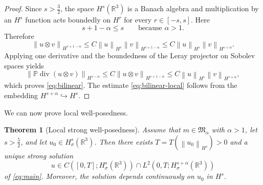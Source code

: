 \documentclass[11pt]{article}
\newtheorem{theorem}{Theorem}[section]
\theoremstyle{definition}
\theoremstyle{remark}
\newcommand{\R}{\mathbb{R}}
\newcommand{\Pcal}{\mathbb{P}}
\newcommand{\norm}[1]{\left\lVert #1\right\rVert}
\newcommand{\diver}{\operatorname{div}}
\begin{document}
\begin{proof}
Since $s>\frac32$, the space $H^s(\R^3)$ is a Banach algebra and multiplication by an $H^s$ function acts boundedly on $H^r$ for every $r\in[-s,s]$. Here
\[
s+1-\alpha \le s
\qquad \text{because } \alpha>1.
\]
Therefore
\[
\norm{u\otimes v}_{H^{s+1-\alpha}}
\le
C \norm{u}_{H^s}\norm{v}_{H^{s+1-\alpha}}
\le
C \norm{u}_{H^s}\norm{v}_{H^{s+\alpha}}.
\]
Applying one derivative and the boundedness of the Leray projector on Sobolev spaces yields
\[
\norm{\Pcal\diver(u\otimes v)}_{H^{s-\alpha}}
\le
C \norm{u\otimes v}_{H^{s+1-\alpha}}
\le
C \norm{u}_{H^s}\norm{v}_{H^{s+\alpha}},
\]
which proves \eqref{eq:bilinear}. The estimate \eqref{eq:bilinear-local} follows from the embedding $H^{s+\alpha}\hookrightarrow H^s$.
\end{proof}

We can now prove local well-posedness.

\begin{theorem}[Local strong well-posedness]\label{thm:local}
Assume that $m\in\mathfrak M_\alpha$ with $\alpha>1$, let $s>\frac52$, and let $u_0\in H^s_\sigma(\R^3)$. Then there exists $T=T(\norm{u_0}_{H^s})>0$ and a unique strong solution
\[
u\in C([0,T];H^s_\sigma(\R^3))\cap L^2(0,T;H^{s+\alpha}_\sigma(\R^3))
\]
of \eqref{eq:main}. Moreover, the solution depends continuously on $u_0$ in $H^s$.
\end{theorem}
\end{document}

